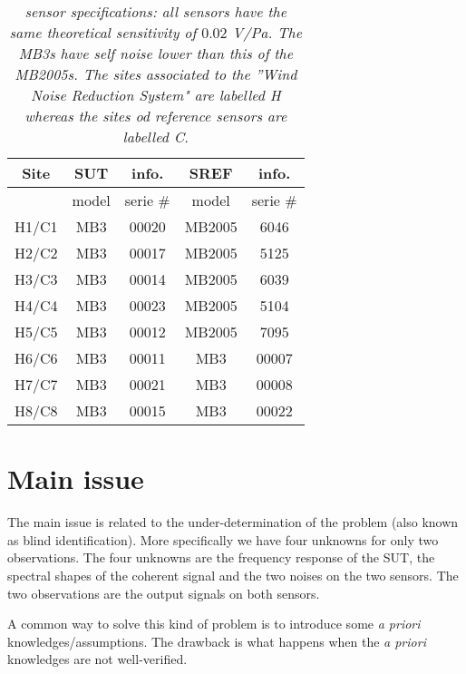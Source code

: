 \begin{table}
\begin{center}
\begin{tabular}{|c||cc|cc||}
\hline
Site & SUT & info.& SREF & info.
\\
\hline
     & model&serie \#     & model&serie \#
\\
H1/C1& MB3 & 00020  & MB2005& 6046
\\
H2/C2& MB3  &  00017  & MB2005& 5125
\\
H3/C3& MB3  &  00014  & MB2005 &6039
\\
H4/C4& MB3  &  00023  & MB2005& 5104
\\
H5/C5& MB3   & 00012  & MB2005 &7095
\\
H6/C6& MB3  &  00011  & MB3 &00007
\\
H7/C7& MB3   & 00021  & MB3 &00008
\\
H8/C8& MB3   & 00015  & MB3 &00022
\\
\hline
\end{tabular}
\parbox{12 cm}
{
    \caption{\protect\small\it  sensor specifications: all sensors have the same theoretical sensitivity of $0.02$ V/Pa. The MB3s have self noise lower than this of the MB2005s. The sites associated to the ''Wind Noise Reduction System" are labelled H whereas  the sites od reference sensors are labelled C.}
    \label{tab:sensor-specifications}
}
\end{center}
\end{table}


 \newpage
\section{Main issue}
The main issue is related to the under-determination of the problem (also known as blind identification). More specifically we have four unknowns for only two observations. The four unknowns are the frequency response of the SUT, the spectral shapes of the coherent signal and the two noises on the two sensors. The two observations are the output signals on both sensors.

A common way to solve this kind of problem is to introduce some {\it a priori} knowledges/assumptions. The drawback is what happens when the {\it a priori} knowledges are not well-verified.

